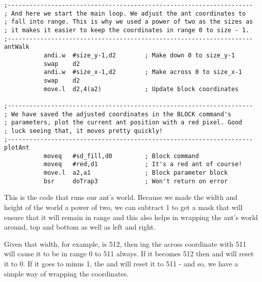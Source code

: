 \begin{lstlisting}[firstnumber=last,caption={Langtons Ant - Start of Loop}]
;--------------------------------------------------------------------
; And here we start the main loop. We adjust the ant coordinates to
; fall into range. This is why we used a power of two as the sizes as
; it makes it easier to keep the coordinates in range 0 to size - 1.
;--------------------------------------------------------------------
antWalk
           andi.w  #size_y-1,d2        ; Make down 0 to size_y-1
           swap    d2
           andi.w  #size_x-1,d2        ; Make across 0 to size_x-1
           swap    d2
           move.l  d2,4(a2)            ; Update block coordinates

;--------------------------------------------------------------------
; We have saved the adjusted coordinates in the BLOCK command's 
; parameters, plot the current ant position with a red pixel. Good
; luck seeing that, it moves pretty quickly!
;--------------------------------------------------------------------
plotAnt
           moveq   #sd_fill,d0         ; Block command
           moveq   #red,d1             ; It's a red ant of course!
           move.l  a2,a1               ; Block parameter block
           bsr     doTrap3             ; Won't return on error

\end{lstlisting}

This is the code that runs our ant's world. Because we made the width and height of the world a power of two, we can subtract 1 to get a mask that will ensure that it will remain in range and this also helps in wrapping the ant's world around, top and bottom as well as left and right. 

Given that width, for example, is 512, then ing the across coordinate with 511 will cause it to be in range 0 to 511 always. If it becomes 512 then and will reset it to 0. If it goes to minus 1, the and will reset it to 511 - and so, we have a simple way of wrapping the coordinates.

